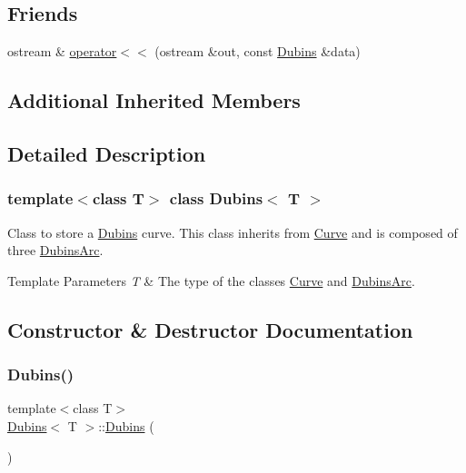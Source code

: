 \subsection*{Friends}
\begin{DoxyCompactItemize}
\item 
ostream \& \mbox{\hyperlink{class_dubins_a0178baccb8eb26af22a5eb717f394c8c}{operator$<$$<$}} (ostream \&out, const \mbox{\hyperlink{class_dubins}{Dubins}} \&data)
\end{DoxyCompactItemize}
\subsection*{Additional Inherited Members}


\subsection{Detailed Description}
\subsubsection*{template$<$class T$>$\newline
class Dubins$<$ T $>$}

Class to store a \mbox{\hyperlink{class_dubins}{Dubins}} curve. This class inherits from {\ttfamily \mbox{\hyperlink{class_curve}{Curve}}} and is composed of three {\ttfamily \mbox{\hyperlink{class_dubins_arc}{Dubins\+Arc}}}. 


\begin{DoxyTemplParams}{Template Parameters}
{\em T} & The type of the classes {\ttfamily \mbox{\hyperlink{class_curve}{Curve}}} and {\ttfamily \mbox{\hyperlink{class_dubins_arc}{Dubins\+Arc}}}. \\
\hline
\end{DoxyTemplParams}


\subsection{Constructor \& Destructor Documentation}
\mbox{\label{class_dubins_acc45a9db5f20150b58d4fc36ad1548fa}} 
\subsubsection{\texorpdfstring{Dubins()}{Dubins()}\hspace{0.1cm}{\footnotesize\ttfamily [1/4]}}
{\footnotesize\ttfamily template$<$class T$>$ \\
\mbox{\hyperlink{class_dubins}{Dubins}}$<$ T $>$\+::\mbox{\hyperlink{class_dubins}{Dubins}} (\begin{DoxyParamCaption}{ }\end{DoxyParamCaption})\hspace{0.3cm}{\ttfamily [inline]}}

